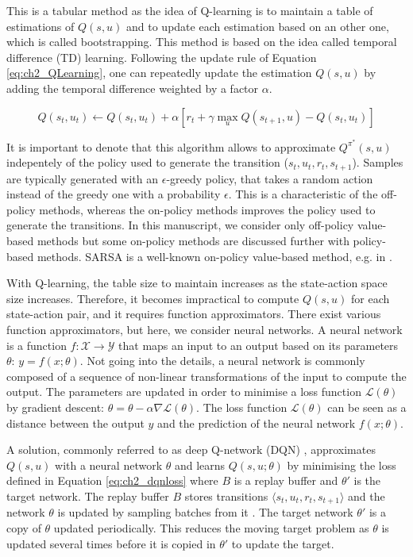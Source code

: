 This is a tabular method as the idea of Q-learning is to maintain a table of estimations of $Q(s, u)$ and to update each estimation based on an other one, which is called bootstrapping.
This method is based on the idea called temporal difference (TD) learning.
Following the update rule of Equation \ref{eq:ch2_QLearning}, one can repeatedly update the estimation $Q(s, u)$ by adding the temporal difference weighted by a factor $\alpha$.

\begin{equation}
\label{eq:ch2_QLearning}
    Q(s_t, u_t) \leftarrow Q(s_t, u_t) + \alpha \left[ r_t + \gamma \max_u Q(s_{t+1}, u) - Q(s_t, u_t) \right]
\end{equation}

It is important to denote that this algorithm allows to approximate $Q^{\pi^*}(s, u)$ indepentely of the policy used to generate the transition ($s_t, u_t, r_t, s_{t+1}$).
Samples are typically generated with an $\epsilon$-greedy policy, that takes a random action instead of the greedy one with a probability $\epsilon$.
This is a characteristic of the off-policy methods, whereas the on-policy methods improves the policy used to generate the transitions.
In this manuscript, we consider only off-policy value-based methods but some on-policy methods are discussed further with policy-based methods.
SARSA is a well-known on-policy value-based method, e.g. in \citep{sutton2018reinforcement}.

With Q-learning, the table size to maintain increases as the state-action space size increases.
Therefore, it becomes impractical to compute $Q(s, u)$ for each state-action pair, and it requires function approximators.
There exist various function approximators, but here, we consider neural networks.
A neural network is a function $f: \mathcal{X} \rightarrow \mathcal{Y}$ that maps an input to an output based on its parameters $\theta$: $y = f(x;\theta)$.
Not going into the details, a neural network is commonly composed of a sequence of non-linear transformations of the input to compute the output.
The parameters are updated in order to minimise a loss function $\mathcal{L}(\theta)$ by gradient descent: $\theta = \theta - \alpha \nabla \mathcal{L}(\theta)$.
The loss function $\mathcal{L}(\theta)$ can be seen as a distance between the output $y$ and the prediction of the neural network $f(x;\theta)$.

A solution, commonly referred to as deep Q-network (DQN) \citep{Mnih2015}, approximates $Q(s, u)$ with a neural network $\theta$ and learns $Q(s, u;\theta)$ by minimising the loss defined in Equation \ref{eq:ch2_dqnloss} where $B$ is a replay buffer and $\theta'$ is the target network.
The replay buffer $B$ stores transitions $\langle s_{t},u_{t},r_{t},s_{t+1}\rangle$ and the network $\theta$ is updated by sampling batches from it \citep{lin1992self}.
The target network $\theta'$ is a copy of $\theta$ updated periodically.
This reduces the moving target problem as $\theta$ is updated several times before it is copied in $\theta'$ to update the target.

